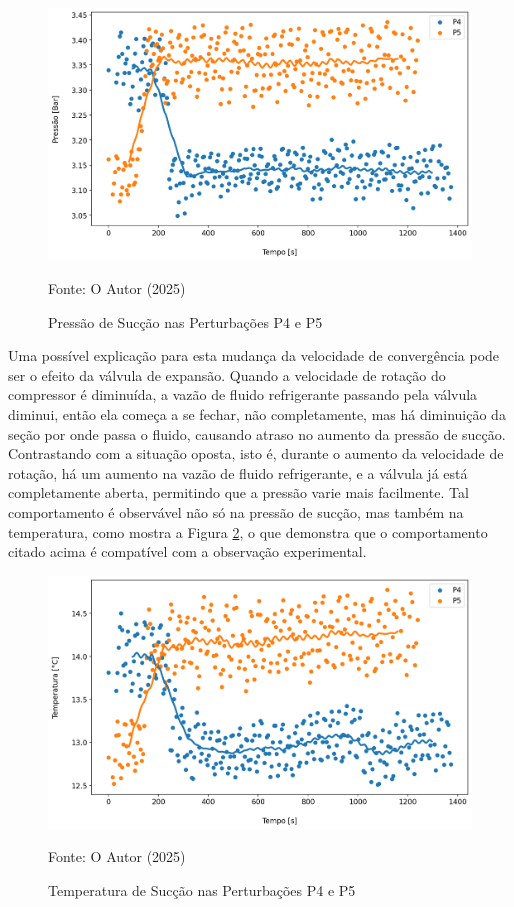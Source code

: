 \begin{figure}[h]
    \centering
    \includegraphics[width=1\linewidth]{FigurasdoTexto/Pressão de sucção subida e descida1.png}
    \caption{Pressão de Sucção nas Perturbações P4 e P5}
    \label{fig:PressãodeSucçãoSubidaeDescida}
    {\footnotesize Fonte: O Autor (2025)}
\end{figure}

Uma possível explicação para esta mudança da velocidade de convergência pode ser o efeito da válvula de expansão. Quando a velocidade de rotação do compressor é diminuída, a vazão de fluido refrigerante passando pela válvula diminui, então ela começa a se fechar, não completamente, mas há diminuição da seção por onde passa o fluido, causando atraso no aumento da pressão de sucção. Contrastando com a situação oposta, isto é, durante o aumento da velocidade de rotação, há um aumento na vazão de fluido refrigerante, e a válvula já está completamente aberta, permitindo que a pressão varie mais facilmente. Tal comportamento é observável não só na pressão de sucção, mas também na temperatura, como mostra a Figura \ref{fig:TempSucçãoSubidaeDescida}, o que demonstra que o comportamento citado acima é compatível com a observação experimental.
\newpage
\begin{figure}[h]
    \centering
    \includegraphics[width=1\linewidth]{FigurasdoTexto/Temperatura de Sucçãohyst.png}
    \caption{Temperatura de Sucção  nas Perturbações P4 e P5}
    \label{fig:TempSucçãoSubidaeDescida}
    {\footnotesize Fonte: O Autor (2025)}
\end{figure}

